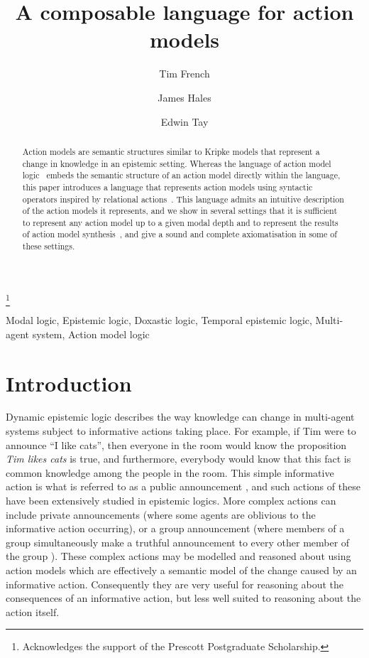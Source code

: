 \documentclass[twoside]{aiml14}
\begin{document}
\begin{frontmatter}
  \title{A composable language for action models}
  \author{Tim French}
  \author{James Hales}\footnote{Acknowledges the support of the Prescott Postgraduate Scholarship.}
  \author{Edwin Tay}
  \address{Computer Science and Software Engineering\\The University of Western
Australia\\Perth, Australia}
  
  \begin{abstract}
  Action models are semantic structures similar to Kripke models that represent
  a change in knowledge in an epistemic setting. Whereas the language of action
  model logic~\cite{baltag1998,baltag2005} embeds the semantic structure of an
  action model directly within the language, this paper introduces a language
  that represents action models using syntactic operators inspired by 
  relational actions~\cite{vanditmarsch1999,vanditmarsch2001,vanditmarsch2002}.
  This language admits an intuitive description of the action
  models it represents, and we show in several settings that it is sufficient
  to represent any action model up to a given modal depth and to represent the
  results of action model synthesis~\cite{hales2013},
  and give a sound and complete axiomatisation in some of these settings.
  \end{abstract}

  \begin{keyword}
  Modal logic,
  Epistemic logic,
  Doxastic logic,
  Temporal epistemic logic,
  Multi-agent system,
  Action model logic
  \end{keyword}
 \end{frontmatter}

  \section{Introduction}

  Dynamic epistemic logic describes the way knowledge can change in multi-agent
  systems subject to informative actions taking place. For example, if Tim were
  to announce ``I like cats'', then everyone in the room would know the
  proposition {\it Tim likes cats} is true, and furthermore, everybody would
  know that this fact is common knowledge among the people in the room. This
  simple informative action is what is referred to as a public announcement
  \cite{plaza1989}, and such actions of these have been extensively studied in
  epistemic logics. More complex actions can include private announcements
  (where some agents are oblivious to the informative action occurring), or a
  group announcement (where members of a group simultaneously make a truthful
  announcement to every other member of the group \cite{agotnes2010}). These
  complex actions may be modelled and reasoned about using action models
  \cite{baltag1998} which are effectively a semantic model of the change caused
  by an informative action. Consequently they are very useful for reasoning
  about the consequences of an informative action, but less well suited to
  reasoning about the action itself.
  
\end{document}
